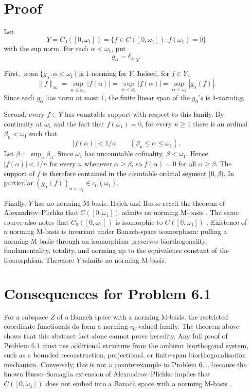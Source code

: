 \documentclass[11pt]{article}
\newcommand{\spn}{\operatorname{span}}
\begin{document}
\section*{Proof}

Let
\[
  Y=C_0([0,\omega_1])
   =\{f\in C([0,\omega_1]): f(\omega_1)=0\}
\]
with the sup norm. For each \(\alpha<\omega_1\), put
\[
  g_\alpha=\delta_\alpha|_Y .
\]

First, \(\spn\{g_\alpha:\alpha<\omega_1\}\) is \(1\)-norming for \(Y\). Indeed,
for \(f\in Y\),
\[
  \|f\|_\infty
    =\sup_{\alpha\leq\omega_1}|f(\alpha)|
    =\sup_{\alpha<\omega_1}|f(\alpha)|
    =\sup_{\alpha<\omega_1}|g_\alpha(f)|.
\]
Since each \(g_\alpha\) has norm at most \(1\), the finite linear span of the
\(g_\alpha\)'s is \(1\)-norming.

Second, every \(f\in Y\) has countable support with respect to this family.
By continuity at \(\omega_1\) and the fact that \(f(\omega_1)=0\), for every
\(n\geq1\) there is an ordinal \(\beta_n<\omega_1\) such that
\[
  |f(\alpha)|<1/n \qquad(\beta_n\leq\alpha\leq\omega_1).
\]
Let \(\beta=\sup_n\beta_n\). Since \(\omega_1\) has uncountable cofinality,
\(\beta<\omega_1\). Hence \(|f(\alpha)|<1/n\) for every \(n\) whenever
\(\alpha\geq\beta\), so \(f(\alpha)=0\) for all \(\alpha\geq\beta\). The
support of \(f\) is therefore contained in the countable ordinal segment
\([0,\beta)\). In particular
\((g_\alpha(f))_{\alpha<\omega_1}\in c_0(\omega_1)\).

Finally, \(Y\) has no norming M-basis. Hajek and Russo recall the theorem of
Alexandrov--Plichko that \(C([0,\omega_1])\) admits no norming M-basis
\cite[Theorem 4.2]{HR}. The same source also notes that
\(C_0([0,\omega_1])\) is isomorphic to \(C([0,\omega_1])\)
\cite[Example 4.1]{HR}. Existence of a norming M-basis is invariant under
Banach-space isomorphism: pulling a norming M-basis through an isomorphism
preserves biorthogonality, fundamentality, totality, and norming up to the
equivalence constant of the isomorphism. Therefore \(Y\) admits no norming
M-basis.

\section*{Consequences for Problem 6.1}

For a subspace \(Z\) of a Banach space with a norming M-basis, the restricted
coordinate functionals do form a norming \(c_0\)-valued family. The theorem
above shows that this abstract fact alone cannot prove heredity. Any full
proof of Problem 6.1 must use additional structure from the ambient
biorthogonal system, such as a bounded reconstruction, projectional, or
finite-span biorthogonalisation mechanism. Conversely, this is not a
counterexample to Problem 6.1, because the known Russo--Somaglia extension of
Alexandrov--Plichko implies that \(C([0,\omega_1])\) does not embed into a
Banach space with a norming M-basis \cite[Section 6]{HR}.
\end{document}
